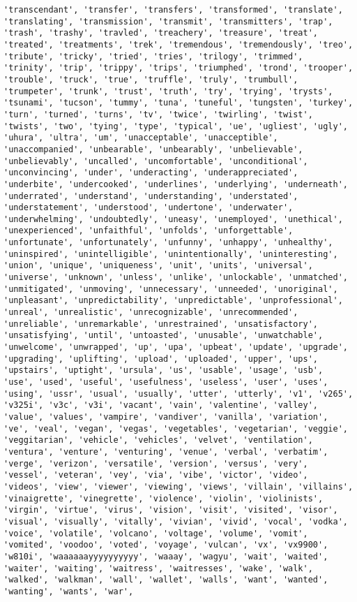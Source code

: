 \documentclass[11pt]{article}
\begin{document}
\begin{Verbatim}[commandchars=\\\{\}]
'transcendant', 'transfer', 'transfers', 'transformed', 'translate', 'translating', 'transmission', 'transmit', 'transmitters', 'trap', 'trash', 'trashy', 'travled', 'treachery', 'treasure', 'treat', 'treated', 'treatments', 'trek', 'tremendous', 'tremendously', 'treo', 'tribute', 'tricky', 'tried', 'tries', 'trilogy', 'trimmed', 'trinity', 'trip', 'trippy', 'trips', 'triumphed', 'trond', 'trooper', 'trouble', 'truck', 'true', 'truffle', 'truly', 'trumbull', 'trumpeter', 'trunk', 'trust', 'truth', 'try', 'trying', 'trysts', 'tsunami', 'tucson', 'tummy', 'tuna', 'tuneful', 'tungsten', 'turkey', 'turn', 'turned', 'turns', 'tv', 'twice', 'twirling', 'twist', 'twists', 'two', 'tying', 'type', 'typical', 'ue', 'ugliest', 'ugly', 'uhura', 'ultra', 'um', 'unacceptable', 'unacceptible', 'unaccompanied', 'unbearable', 'unbearably', 'unbelievable', 'unbelievably', 'uncalled', 'uncomfortable', 'unconditional', 'unconvincing', 'under', 'underacting', 'underappreciated', 'underbite', 'undercooked', 'underlines', 'underlying', 'underneath', 'underrated', 'understand', 'understanding', 'understated', 'understatement', 'understood', 'undertone', 'underwater', 'underwhelming', 'undoubtedly', 'uneasy', 'unemployed', 'unethical', 'unexperienced', 'unfaithful', 'unfolds', 'unforgettable', 'unfortunate', 'unfortunately', 'unfunny', 'unhappy', 'unhealthy', 'uninspired', 'unintelligible', 'unintentionally', 'uninteresting', 'union', 'unique', 'uniqueness', 'unit', 'units', 'universal', 'universe', 'unknown', 'unless', 'unlike', 'unlockable', 'unmatched', 'unmitigated', 'unmoving', 'unnecessary', 'unneeded', 'unoriginal', 'unpleasant', 'unpredictability', 'unpredictable', 'unprofessional', 'unreal', 'unrealistic', 'unrecognizable', 'unrecommended', 'unreliable', 'unremarkable', 'unrestrained', 'unsatisfactory', 'unsatisfying', 'until', 'untoasted', 'unusable', 'unwatchable', 'unwelcome', 'unwrapped', 'up', 'upa', 'upbeat', 'update', 'upgrade', 'upgrading', 'uplifting', 'upload', 'uploaded', 'upper', 'ups', 'upstairs', 'uptight', 'ursula', 'us', 'usable', 'usage', 'usb', 'use', 'used', 'useful', 'usefulness', 'useless', 'user', 'uses', 'using', 'ussr', 'usual', 'usually', 'utter', 'utterly', 'v1', 'v265', 'v325i', 'v3c', 'v3i', 'vacant', 'vain', 'valentine', 'valley', 'value', 'values', 'vampire', 'vandiver', 'vanilla', 'variation', 've', 'veal', 'vegan', 'vegas', 'vegetables', 'vegetarian', 'veggie', 'veggitarian', 'vehicle', 'vehicles', 'velvet', 'ventilation', 'ventura', 'venture', 'venturing', 'venue', 'verbal', 'verbatim', 'verge', 'verizon', 'versatile', 'version', 'versus', 'very', 'vessel', 'veteran', 'vey', 'via', 'vibe', 'victor', 'video', 'videos', 'view', 'viewer', 'viewing', 'views', 'villain', 'villains', 'vinaigrette', 'vinegrette', 'violence', 'violin', 'violinists', 'virgin', 'virtue', 'virus', 'vision', 'visit', 'visited', 'visor', 'visual', 'visually', 'vitally', 'vivian', 'vivid', 'vocal', 'vodka', 'voice', 'volatile', 'volcano', 'voltage', 'volume', 'vomit', 'vomited', 'voodoo', 'voted', 'voyage', 'vulcan', 'vx', 'vx9900', 'w810i', 'waaaaaayyyyyyyyyy', 'waaay', 'wagyu', 'wait', 'waited', 'waiter', 'waiting', 'waitress', 'waitresses', 'wake', 'walk', 'walked', 'walkman', 'wall', 'wallet', 'walls', 'want', 'wanted', 'wanting', 'wants', 'war', 
\end{Verbatim}
\end{document}
